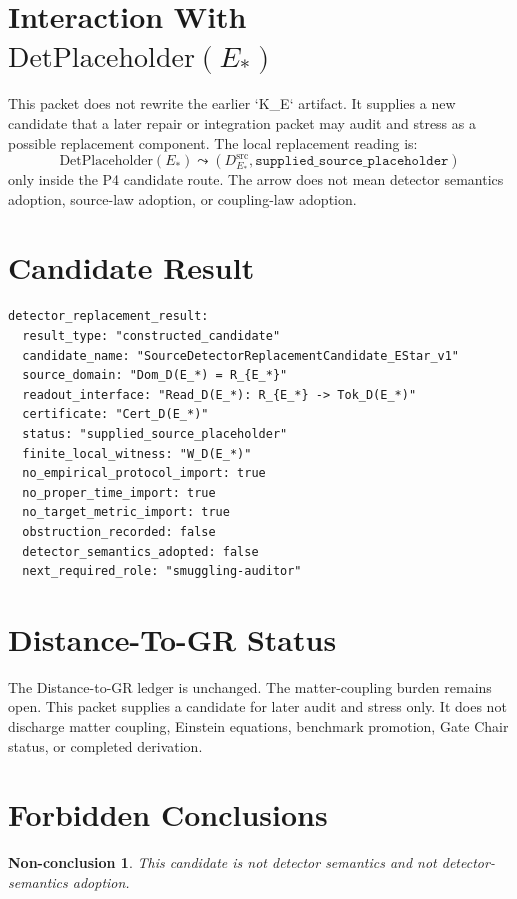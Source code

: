 \documentclass[11pt]{article}
\newcommand{\EStar}{E_{\ast}}
\newcommand{\DSrc}{D^{\mathrm{src}}_{E_{\ast}}}
\newcommand{\DetPlaceholder}{\mathrm{DetPlaceholder}}
\newtheorem{nonconclusion}{Non-conclusion}
\begin{document}
\section{Interaction With \(\DetPlaceholder(\EStar)\)}

This packet does not rewrite the earlier `K_E` artifact. It supplies a new
candidate that a later repair or integration packet may audit and stress as a
possible replacement component. The local replacement reading is:
\[
  \DetPlaceholder(\EStar)
  \leadsto
  (\DSrc,\texttt{supplied\_source\_placeholder})
\]
only inside the P4 candidate route. The arrow does not mean detector
semantics adoption, source-law adoption, or coupling-law adoption.

\section{Candidate Result}

\begin{verbatim}
detector_replacement_result:
  result_type: "constructed_candidate"
  candidate_name: "SourceDetectorReplacementCandidate_EStar_v1"
  source_domain: "Dom_D(E_*) = R_{E_*}"
  readout_interface: "Read_D(E_*): R_{E_*} -> Tok_D(E_*)"
  certificate: "Cert_D(E_*)"
  status: "supplied_source_placeholder"
  finite_local_witness: "W_D(E_*)"
  no_empirical_protocol_import: true
  no_proper_time_import: true
  no_target_metric_import: true
  obstruction_recorded: false
  detector_semantics_adopted: false
  next_required_role: "smuggling-auditor"
\end{verbatim}

\section{Distance-To-GR Status}

The Distance-to-GR ledger is unchanged. The matter-coupling burden remains
open. This packet supplies a candidate for later audit and stress only. It
does not discharge matter coupling, Einstein equations, benchmark promotion,
Gate Chair status, or completed derivation.

\section{Forbidden Conclusions}

\begin{nonconclusion}
This candidate is not detector semantics and not detector-semantics adoption.
\end{nonconclusion}
\end{document}
